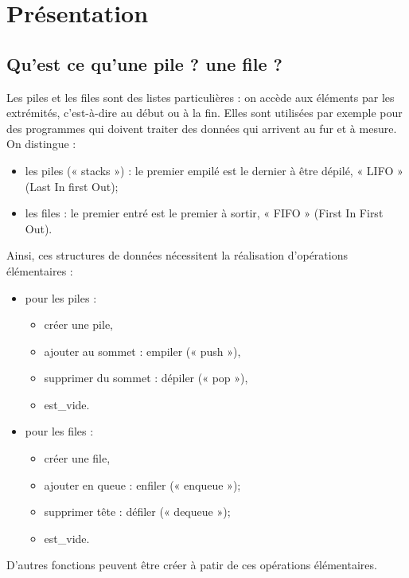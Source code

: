 \documentclass[10pt,fleqn]{article} %
\begin{document}


\section{Présentation}
\subsection{Qu'est ce qu'une pile ? une file ?}
Les piles et les files sont des listes particulières : on accède aux éléments par les extrémités, c'est-à-dire au début ou à la fin.
Elles sont utilisées par exemple pour des programmes qui doivent traiter des données qui arrivent au fur et à mesure.
On distingue :
\begin{itemize}[label=,font=\color{ocre}] 
\item les piles (« stacks ») : le premier empilé est le dernier à être dépilé, « LIFO » (Last In first Out);
\item les files : le premier entré est le premier à sortir, « FIFO » (First In First Out).
\end{itemize}\vspace{.25cm}
\noindent\begin{minipage}[c]{.53\linewidth}
\indent Ainsi, ces structures de données nécessitent la réalisation d'opérations élémentaires :
\begin{itemize}[label=,font=\color{ocre}] 
\item pour les piles :
\begin{itemize}[label=,font=\color{ocre}] 
\item créer une pile,
\item ajouter au sommet : empiler (« push »),
\item supprimer du sommet : dépiler (« pop »),
\item est\_vide.
\end{itemize} 
\item pour les files :
\begin{itemize}[label=,font=\color{ocre}] 
\item créer une file,
\item ajouter en queue : enfiler (« enqueue »);
\item supprimer tête : défiler (« dequeue »);
\item est\_vide.
\end{itemize}
\end{itemize}
D'autres fonctions peuvent être créer à patir de ces opérations élémentaires.
\end{minipage} \hfill
\end{document}
